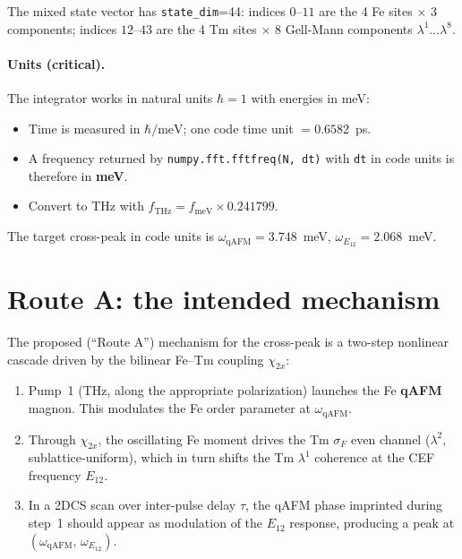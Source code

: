 \documentclass[11pt,a4paper]{article}
\newcommand{\qAFM}{\mathrm{qAFM}}
\newcommand{\EtA}{E_{12}}
\newcommand{\chitwox}{\chi_{2x}}
\newcommand{\crossP}{(\omega_{\qAFM},\,\omega_{\EtA})}
\newcommand{\meVtoTHz}{0.241799}
\begin{document}
The mixed state vector has \texttt{state\_dim}=44: indices $0$--$11$ are the
4 Fe sites $\times$ 3 components; indices $12$--$43$ are the 4 Tm sites
$\times$ 8 Gell-Mann components $\lambda^1\dots\lambda^8$.

\paragraph{Units (critical).}
The integrator works in natural units $\hbar=1$ with energies in meV:
\begin{itemize}[nosep]
  \item Time is measured in $\hbar/\text{meV}$; one code time unit $=0.6582$~ps.
  \item A frequency returned by \texttt{numpy.fft.fftfreq(N,\,dt)} with
        \texttt{dt} in code units is therefore in \textbf{meV}.
  \item Convert to THz with $f_{\text{THz}} = f_{\text{meV}}\times\meVtoTHz$.
\end{itemize}
The target cross-peak in code units is
$\omega_{\qAFM}=3.748$~meV, $\omega_{\EtA}=2.068$~meV.

\section{Route A: the intended mechanism}

The proposed (``Route A'') mechanism for the cross-peak is a two-step
nonlinear cascade driven by the bilinear Fe--Tm coupling $\chitwox$:
\begin{enumerate}[nosep]
  \item Pump~1 (THz, along the appropriate polarization) launches the Fe
        \textbf{qAFM} magnon. This modulates the Fe order parameter at
        $\omega_{\qAFM}$.
  \item Through $\chitwox$, the oscillating Fe moment drives the Tm
        $\sigma_F$ even channel ($\lambda^2$, sublattice-uniform), which in
        turn shifts the Tm $\lambda^1$ coherence at the CEF frequency
        $\EtA$.
  \item In a 2DCS scan over inter-pulse delay $\tau$, the qAFM phase imprinted
        during step~1 should appear as modulation of the $\EtA$ response,
        producing a peak at $\crossP$.
\end{enumerate}
\end{document}
